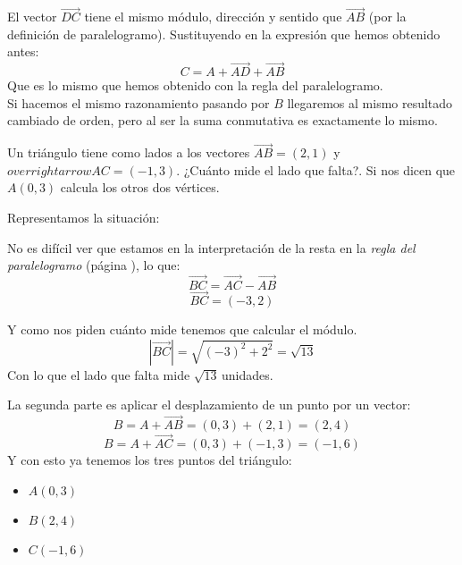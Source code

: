 \documentclass[a4paper,11pt,answers]{exam}
\begin{document}
\begin{questions}
\begin{solution}
    El vector $\overrightarrow{DC}$ tiene el mismo módulo, dirección y sentido que
    $\overrightarrow{AB}$ (por la definición de paralelogramo). Sustituyendo en la expresión que
    hemos obtenido antes:
    \[C = A + \overrightarrow{AD} + \overrightarrow{AB}\]
    Que es lo mismo que hemos obtenido con la regla del paralelogramo.\\
    
    \vspace{5mm}Si hacemos el mismo razonamiento pasando por $B$ llegaremos al mismo resultado
    cambiado de orden, pero al ser la suma conmutativa es exactamente lo mismo.
  \end{solution}
\question Un triángulo tiene como lados a los vectores $\overrightarrow{AB} = (2, 1)$ y
  $overrightarrow{AC} = (-1, 3)$. ¿Cuánto mide el lado que falta?. Si nos dicen que $A(0,3)$
  calcula los otros dos vértices.
  \begin{solution}
    Representamos la situación:
    \begin{center}
    \end{center}

    No es difícil ver que estamos en la interpretación de la resta en la \emph{regla del
      paralelogramo} (página \pageref{regla_paralelogramo}), lo que:
    \[\overrightarrow{BC} = \overrightarrow{AC} - \overrightarrow{AB}\]
    \[\overrightarrow{BC} = (-3, 2)\]

    Y como nos piden cuánto mide tenemos que calcular el módulo.
    \[|\overrightarrow{BC}| = \sqrt{(-3)^2 + 2^2} = \sqrt{13}\]
    Con lo que el lado que falta mide $\sqrt{13}$\,unidades.

    \vspace{1cm}La segunda parte es aplicar el desplazamiento de un punto por un vector:
    \[B = A + \overrightarrow{AB} = (0,3) + (2, 1) = (2,4)\]
    \[B = A + \overrightarrow{AC} = (0,3) + (-1, 3) = (-1,6)\]
    Y con esto ya tenemos los tres puntos del triángulo:
    \begin{itemize}
    \item $A(0, 3)$
    \item $B(2, 4)$
    \item $C(-1, 6)$
    \end{itemize}
  \end{solution}
\end{questions}
\end{document}
